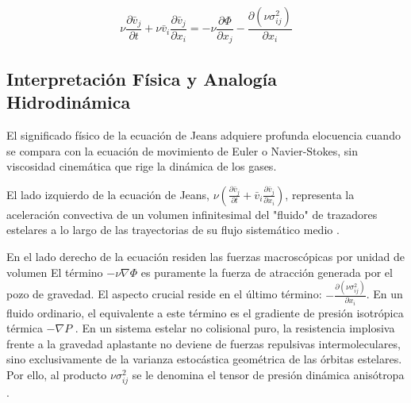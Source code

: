                 $$\nu \frac{\partial \bar{v}_j}{\partial t} + \nu \bar{v}_i 
                \frac{\partial \bar{v}_j}{\partial x_i} = -\nu \frac{\partial 
                \Phi}{\partial x_j} - \frac{\partial (\nu \sigma_{ij}^2)}{
                \partial x_i}$$

        \subsection{Interpretación Física y Analogía Hidrodinámica}
                El significado físico de la ecuación de Jeans adquiere profunda 
                elocuencia cuando se compara con la ecuación de movimiento de 
                Euler o Navier-Stokes, sin viscosidad cinemática que rige la 
                dinámica de los gases.

                El lado izquierdo de la ecuación de Jeans, $\nu (\frac{\partial 
                \bar{v}_j}{\partial t} + \bar{v}_i \frac{\partial \bar{v}_j}{
                \partial x_i})$, representa la aceleración convectiva de un 
                volumen infinitesimal del "fluido" de trazadores estelares a lo 
                largo de las trayectorias de su flujo sistemático medio 
                \cite{binney_tremaine_2008}.

                En el lado derecho de la ecuación residen las fuerzas 
                macroscópicas por unidad de volumen  El término $-\nu \nabla 
                \Phi$ es puramente la fuerza de atracción generada por el pozo 
                de gravedad. El aspecto crucial reside en el último término: 
                $-\frac{\partial (\nu \sigma_{ij}^2)}{\partial x_i}$. En un 
                fluido ordinario, el equivalente a este término es el gradiente 
                de presión isotrópica térmica $-\nabla P$ 
                \cite{binney_tremaine_2008}. En un sistema estelar no colisional 
                puro, la resistencia implosiva frente a la gravedad aplastante 
                no deviene de fuerzas repulsivas intermoleculares, sino 
                exclusivamente de la varianza estocástica geométrica de las 
                órbitas estelares. Por ello, al producto $\nu \sigma_{ij}^2$ se 
                le denomina el tensor de presión dinámica anisótropa 
                \cite{mamon2010kinematic}.

